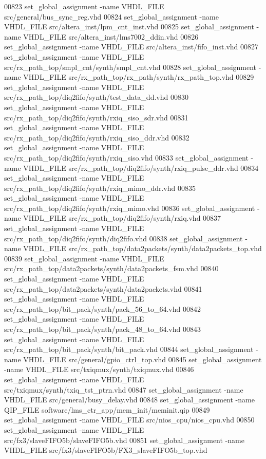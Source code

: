 \begin{DoxyCode}
00823 set\_global\_assignment -name VHDL\_FILE src/general/bus\_sync\_reg.vhd
00824 set\_global\_assignment -name VHDL\_FILE src/altera\_inst/lpm\_cnt\_inst.vhd
00825 set\_global\_assignment -name VHDL\_FILE src/altera\_inst/lms7002\_ddin.vhd
00826 set\_global\_assignment -name VHDL\_FILE src/altera\_inst/fifo\_inst.vhd
00827 set\_global\_assignment -name VHDL\_FILE src/rx\_path\_top/smpl\_cnt/synth/smpl\_cnt.vhd
00828 set\_global\_assignment -name VHDL\_FILE src/rx\_path\_top/rx\_path/synth/rx\_path\_top.vhd
00829 set\_global\_assignment -name VHDL\_FILE src/rx\_path\_top/diq2fifo/synth/test\_data\_dd.vhd
00830 set\_global\_assignment -name VHDL\_FILE src/rx\_path\_top/diq2fifo/synth/rxiq\_siso\_sdr.vhd
00831 set\_global\_assignment -name VHDL\_FILE src/rx\_path\_top/diq2fifo/synth/rxiq\_siso\_ddr.vhd
00832 set\_global\_assignment -name VHDL\_FILE src/rx\_path\_top/diq2fifo/synth/rxiq\_siso.vhd
00833 set\_global\_assignment -name VHDL\_FILE src/rx\_path\_top/diq2fifo/synth/rxiq\_pulse\_ddr.vhd
00834 set\_global\_assignment -name VHDL\_FILE src/rx\_path\_top/diq2fifo/synth/rxiq\_mimo\_ddr.vhd
00835 set\_global\_assignment -name VHDL\_FILE src/rx\_path\_top/diq2fifo/synth/rxiq\_mimo.vhd
00836 set\_global\_assignment -name VHDL\_FILE src/rx\_path\_top/diq2fifo/synth/rxiq.vhd
00837 set\_global\_assignment -name VHDL\_FILE src/rx\_path\_top/diq2fifo/synth/diq2fifo.vhd
00838 set\_global\_assignment -name VHDL\_FILE src/rx\_path\_top/data2packets/synth/data2packets\_top.vhd
00839 set\_global\_assignment -name VHDL\_FILE src/rx\_path\_top/data2packets/synth/data2packets\_fsm.vhd
00840 set\_global\_assignment -name VHDL\_FILE src/rx\_path\_top/data2packets/synth/data2packets.vhd
00841 set\_global\_assignment -name VHDL\_FILE src/rx\_path\_top/bit\_pack/synth/pack\_56\_to\_64.vhd
00842 set\_global\_assignment -name VHDL\_FILE src/rx\_path\_top/bit\_pack/synth/pack\_48\_to\_64.vhd
00843 set\_global\_assignment -name VHDL\_FILE src/rx\_path\_top/bit\_pack/synth/bit\_pack.vhd
00844 set\_global\_assignment -name VHDL\_FILE src/general/gpio\_ctrl\_top.vhd
00845 set\_global\_assignment -name VHDL\_FILE src/txiqmux/synth/txiqmux.vhd
00846 set\_global\_assignment -name VHDL\_FILE src/txiqmux/synth/txiq\_tst\_ptrn.vhd
00847 set\_global\_assignment -name VHDL\_FILE src/general/busy\_delay.vhd
00848 set\_global\_assignment -name QIP\_FILE software/lms\_ctr\_app/mem\_init/meminit.qip
00849 set\_global\_assignment -name VHDL\_FILE src/nios\_cpu/nios\_cpu.vhd
00850 set\_global\_assignment -name VHDL\_FILE src/fx3/slaveFIFO5b/slaveFIFO5b.vhd
00851 set\_global\_assignment -name VHDL\_FILE src/fx3/slaveFIFO5b/FX3\_slaveFIFO5b\_top.vhd

\end{DoxyCode}
